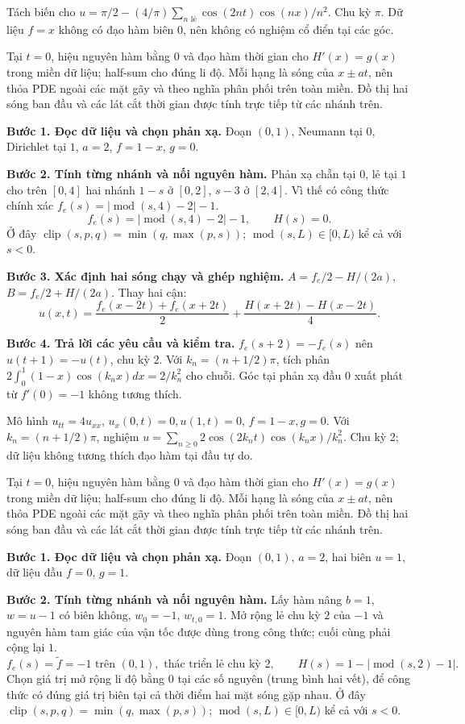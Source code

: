 Tách biến cho $u=\pi/2-(4/\pi)\sum_{n\text{ lẻ}}\cos(2nt)\cos(nx)/n^2$. Chu kỳ $\pi$. Dữ liệu $f=x$ không có đạo hàm biên 0, nên không có nghiệm cổ điển tại các góc.

Tại $t=0$, hiệu nguyên hàm bằng $0$ và đạo hàm thời gian cho $H'(x)=g(x)$ trong miền dữ liệu; half-sum cho đúng li độ. Mỗi hạng là sóng của $x\pm at$, nên thỏa PDE ngoài các mặt gãy và theo nghĩa phân phối trên toàn miền. Đồ thị hai sóng ban đầu và các lát cắt thời gian được tính trực tiếp từ các nhánh trên.

\textbf{Bước 1. Đọc dữ liệu và chọn phản xạ.} Đoạn $(0,1)$, Neumann tại $0$, Dirichlet tại $1$, $a=2$, $f=1-x$, $g=0$.

\textbf{Bước 2. Tính từng nhánh và nối nguyên hàm.} Phản xạ chẵn tại $0$, lẻ tại $1$ cho trên $[0,4]$ hai nhánh $1-s$ ở $[0,2]$, $s-3$ ở $[2,4]$. Vì thế có công thức chính xác $f_e(s)=|\operatorname{mod}(s,4)-2|-1$.
\[f_e(s)=|\operatorname{mod}(s,4)-2|-1,\qquad H(s)=0.\]
Ở đây $\operatorname{clip}(s,p,q)=\min(q,\max(p,s))$; $\operatorname{mod}(s,L)\in[0,L)$ kể cả với $s<0$.

\textbf{Bước 3. Xác định hai sóng chạy và ghép nghiệm.} $A=f_e/2-H/(2a)$, $B=f_e/2+H/(2a)$. Thay hai cận:
\[u(x,t)=\frac{f_e(x-2t)+f_e(x+2t)}2+\frac{H(x+2t)-H(x-2t)}{4}.\]

\textbf{Bước 4. Trả lời các yêu cầu và kiểm tra.} $f_e(s+2)=-f_e(s)$ nên $u(t+1)=-u(t)$, chu kỳ $2$. Với $k_n=(n+1/2)\pi$, tích phân $2\int_0^1(1-x)\cos(k_nx)dx=2/k_n^2$ cho chuỗi. Góc tại phản xạ đầu $0$ xuất phát từ $f'(0)=-1$ không tương thích.

Mô hình $u_{tt}=4u_{xx}$, $u_x(0,t)=0,u(1,t)=0$, $f=1-x,g=0$. Với $k_n=(n+1/2)\pi$, nghiệm $u=\sum_{n\ge0}2\cos(2k_nt)\cos(k_nx)/k_n^2$. Chu kỳ 2; dữ liệu không tương thích đạo hàm tại đầu tự do.

Tại $t=0$, hiệu nguyên hàm bằng $0$ và đạo hàm thời gian cho $H'(x)=g(x)$ trong miền dữ liệu; half-sum cho đúng li độ. Mỗi hạng là sóng của $x\pm at$, nên thỏa PDE ngoài các mặt gãy và theo nghĩa phân phối trên toàn miền. Đồ thị hai sóng ban đầu và các lát cắt thời gian được tính trực tiếp từ các nhánh trên.

\textbf{Bước 1. Đọc dữ liệu và chọn phản xạ.} Đoạn $(0,1)$, $a=2$, hai biên $u=1$, dữ liệu đầu $f=0$, $g=1$.

\textbf{Bước 2. Tính từng nhánh và nối nguyên hàm.} Lấy hàm nâng $b=1$, $w=u-1$ có biên không, $w_0=-1$, $w_{t,0}=1$. Mở rộng lẻ chu kỳ $2$ của $-1$ và nguyên hàm tam giác của vận tốc được dùng trong công thức; cuối cùng phải cộng lại $1$.
\[f_e(s)=\widetilde f=-1\text{ trên }(0,1),\text{ thác triển lẻ chu kỳ }2,\qquad H(s)=1-|\operatorname{mod}(s,2)-1|.\]
Chọn giá trị mở rộng li độ bằng $0$ tại các số nguyên (trung bình hai vết), để công thức có đúng giá trị biên tại cả thời điểm hai mặt sóng gặp nhau.
Ở đây $\operatorname{clip}(s,p,q)=\min(q,\max(p,s))$; $\operatorname{mod}(s,L)\in[0,L)$ kể cả với $s<0$.

